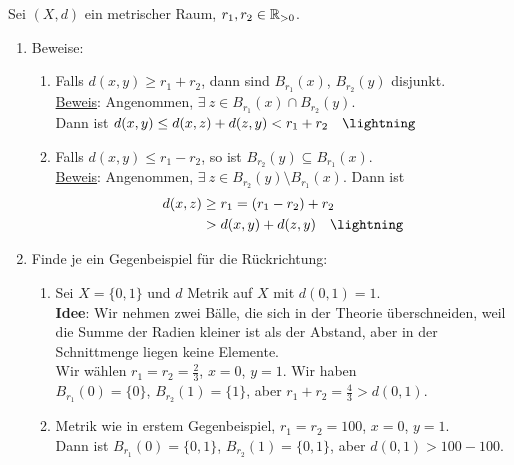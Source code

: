\begin{problem*}[3]
  Sei $ (X, d) $ ein metrischer Raum, $ r_1, r_2 \in \mathbb{R}_{>0} $.
  \begin{enumerate}
    \item Beweise: 
    \begin{enumerate}
      \item Falls $ d(x, y) \geq r_1 + r_2 $, dann sind $ B_{r_1}(x) $, $ B_{r_2}(y) $ disjunkt. \\
        \underline{Beweis}: Angenommen, $ \exists \ z \in B_{r_1}(x) \cap B_{r_2}(y) $. \\
        Dann ist $ d(x,y) \leq d(x,z) + d(z,y) < r_1 + r_2 \quad \lightning \qed $ \\
      \item Falls $ d(x,y) \leq r_1-r_2 $, so ist $ B_{r_2}(y) \subseteq B_{r_1}(x) $. \\
      \underline{Beweis}: Angenommen, $ \exists \ z \in B_{r_2}(y) \setminus B_{r_1}(x) $. Dann ist
      \begin{align*}
        d(x,z) &\geq r_1 = (r_1 - r_2) + r_2 \\
        &> d(x,y) + d(z, y) \quad \lightning \qed
      \end{align*}
    \end{enumerate}
    \item Finde je ein Gegenbeispiel für die Rückrichtung:
    \begin{enumerate}
      \item Sei $ X = \{ 0,1 \} $ und $ d $ Metrik auf $ X $ mit $ d(0,1) = 1 $. \\
        \textbf{Idee}: Wir nehmen zwei Bälle, die sich in der Theorie überschneiden, weil die Summe der Radien kleiner ist als der Abstand, aber in der Schnittmenge liegen keine Elemente. \\
        Wir wählen $ r_1 = r_2 = \frac{2}{3} $, $ x = 0 $, $ y = 1 $. Wir haben \\
        $ B_{r_1}(0) = \{ 0 \} $, $ B_{r_2}(1) = \{ 1 \} $, aber $ r_1 + r_2 = \frac{4}{3} > d(0,1) $. 
        \item Metrik wie in erstem Gegenbeispiel, $ r_1 = r_2 = 100 $, $ x = 0 $, $ y = 1 $. \\
        Dann ist $ B_{r_1}(0) = \{ 0,1 \} $, $ B_{r_2}(1) = \{ 0,1 \} $, aber $ d(0,1) > 100 - 100 $.
    \end{enumerate}
  \end{enumerate}
\end{problem*}


